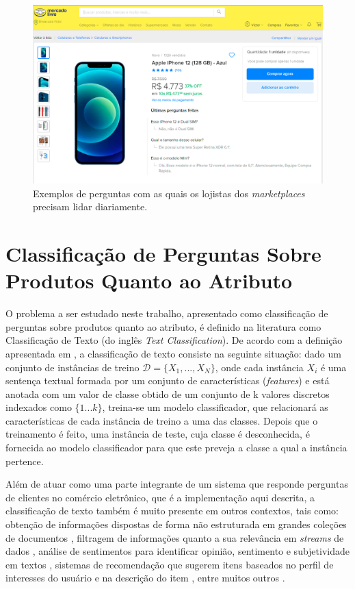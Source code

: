 \begin{figure}[htb]
        \centering
        \includegraphics[width=14cm]{figuras/montagem_perguntas.png}
        \caption{Exemplos de perguntas com as quais os lojistas dos \textit{marketplaces} precisam lidar diariamente.}
        \label{fig:montagem_perguntas}
\end{figure}

\section{Classificação de Perguntas Sobre Produtos Quanto ao Atributo}
\label{classificação}
O problema a ser estudado neste trabalho, apresentado como classificação de perguntas sobre produtos quanto ao atributo, é definido na literatura como Classificação de Texto (do inglês \textit{Text Classification}). De acordo com a definição apresentada em \cite{survey}, a classificação de texto consiste na seguinte situação: dado um conjunto de instâncias de treino $\mathcal{D} = \{X_1, ..., X_N\}$, onde cada instância $X_i$ é uma sentença textual formada por um conjunto de características (\textit{features}) e está anotada com um valor de classe obtido de um conjunto de k valores discretos indexados como $\{1...k\}$,  treina-se um modelo classificador, que relacionará as características de cada instância de treino a uma das classes. Depois que o treinamento é feito, uma instância de teste, cuja classe é desconhecida, é fornecida ao modelo classificador para que este preveja a classe a qual a instância pertence.

Além de atuar como uma parte integrante de um sistema que responde perguntas de clientes no comércio eletrônico, que é a implementação aqui descrita, a classificação de texto também é muito presente em outros contextos, tais como: obtenção de informações dispostas de forma não estruturada em grandes coleções de documentos \cite{info-retrieval}, filtragem de informações quanto a sua relevância em \textit{streams} de dados \cite{info-filtering}, análise de sentimentos para identificar opinião, sentimento e subjetividade em textos \cite{sentiment-analysis}, sistemas de recomendação que sugerem itens baseados no perfil de interesses do usuário e na descrição do item \cite{recommender-systems}, entre muitos outros \cite{survey2}.


